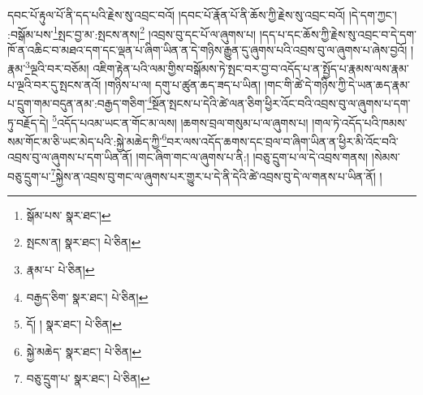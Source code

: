 དབང་པོ་རྟུལ་པོ་ནི་དད་པའི་རྗེས་སུ་འབྲང་བའོ། །དབང་པོ་རྣོན་པོ་ནི་ཆོས་ཀྱི་རྗེས་སུ་འབྲང་བའོ། །དེ་དག་ཀྱང་། :བསྒོམ་པས་\footnote{སྒོམ་པས་  སྣར་ཐང་། }སྤང་བྱ་མ་:སྤངས་ནས།\footnote{སྤངས་ན།  སྣར་ཐང་།  པེ་ཅིན། } །འབྲས་བུ་དང་པོ་ལ་ཞུགས་པ། །དད་པ་དང་ཆོས་ཀྱི་རྗེས་སུ་འབྲང་བ་དེ་དག་ཁོ་ན་འཆིང་བ་མཐའ་དག་དང་ལྡན་པ་ཞིག་ཡིན་ན་དེ་གཉིས་རྒྱུན་དུ་ཞུགས་པའི་འབྲས་བུ་ལ་ཞུགས་པ་ཞེས་བྱའོ། །རྣམ་\footnote{རྣམ་པ་  པེ་ཅིན། }ལྔའི་བར་བཅོམ། འཇིག་རྟེན་པའི་ལམ་གྱིས་བསྒོམས་ཏེ་སྤང་བར་བྱ་བ་འདོད་པ་ན་སྤྱོད་པ་རྣམས་ལས་རྣམ་པ་ལྔའི་བར་དུ་སྤངས་ནའོ། །གཉིས་པ་ལ། དགུ་པ་ཚུན་ཆད་ཟད་པ་ཡིན། །གང་གི་ཚེ་དེ་གཉིས་ཀྱི་དེ་ཡན་ཆད་རྣམ་པ་དྲུག་གམ་བདུན་ནམ་:བརྒྱད་གཅིག་\footnote{བརྒྱད་ཅིག་  སྣར་ཐང་།  པེ་ཅིན། }སྔོན་སྤངས་པ་དེའི་ཚེ་ལན་ཅིག་ཕྱིར་འོང་བའི་འབྲས་བུ་ལ་ཞུགས་པ་དག་ཏུ་བརྗོད་དེ། \footnote{དོ། །   སྣར་ཐང་།  པེ་ཅིན། }འདོད་པའམ་ཡང་ན་གོང་མ་ལས། །ཆགས་བྲལ་གསུམ་པ་ལ་ཞུགས་པ། །གལ་ཏེ་འདོད་པའི་ཁམས་སམ་གོང་མ་ཅི་ཡང་མེད་པའི་:སྐྱེ་མཆེད་ཀྱི་\footnote{སྐྱེ་མཆེད་  སྣར་ཐང་།  པེ་ཅིན། }བར་ལས་འདོད་ཆགས་དང་བྲལ་བ་ཞིག་ཡིན་ན་ཕྱིར་མི་འོང་བའི་འབྲས་བུ་ལ་ཞུགས་པ་དག་ཡིན་ནོ། །གང་ཞིག་གང་ལ་ཞུགས་པ་ནི:། །བཅུ་དྲུག་པ་ལ་དེ་འབྲས་གནས། །སེམས་བཅུ་དྲུག་པ་\footnote{བཅུ་དྲུག་པ་  སྣར་ཐང་།  པེ་ཅིན། }སྐྱེས་ན་འབྲས་བུ་གང་ལ་ཞུགས་པར་གྱུར་པ་དེ་ནི་དེའི་ཚེ་འབྲས་བུ་དེ་ལ་གནས་པ་ཡིན་ནོ། །

